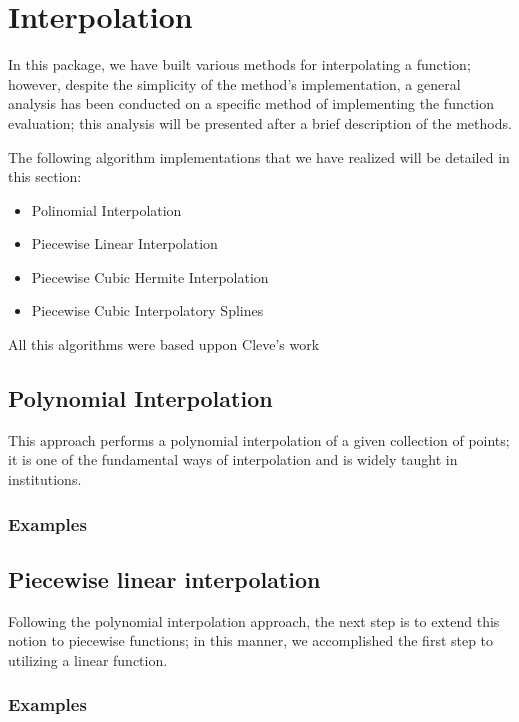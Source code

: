 \section{Interpolation}
In this package, we have built various methods for interpolating a function; however, despite the simplicity of the method's implementation, a general analysis has been conducted on a specific method of implementing the function evaluation; this analysis will be presented after a brief description of the methods.

The following algorithm implementations that we have realized will be detailed in this section:
\begin{itemize}
    \item Polinomial Interpolation 
    \item Piecewise Linear Interpolation 
    \item Piecewise Cubic Hermite Interpolation 
    \item Piecewise Cubic Interpolatory Splines 
\end{itemize}

All this algorithms were based uppon Cleve's work \cite{doi:10.1137/1.9780898717952}
\subsection{Polynomial Interpolation}
This approach performs a polynomial interpolation of a given collection of points; it is one of the fundamental ways of interpolation and is widely taught in institutions.
\subsubsection{Examples}
	


\subsection{Piecewise linear interpolation}
Following the polynomial interpolation approach, the next step is to extend this notion to piecewise functions; in this manner, we accomplished the first step to utilizing a linear function.
\subsubsection{Examples}
	

